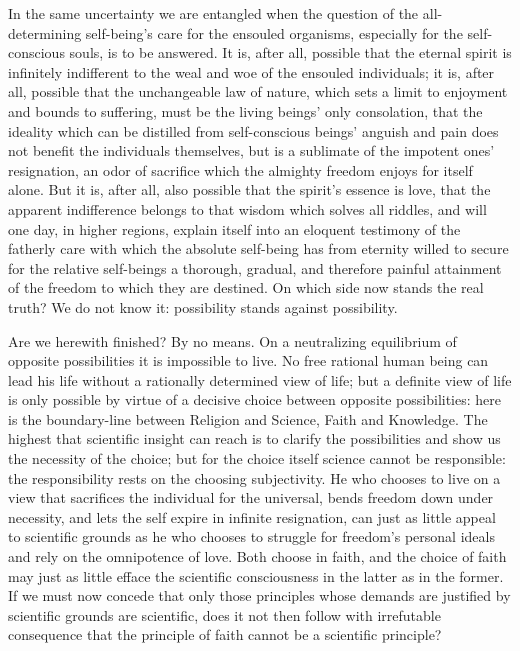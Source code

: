 \documentclass[12pt]{article}
\begin{document}
In the same uncertainty we are entangled when the question of the
all-determining self-being's care for the ensouled organisms, especially for
the self-conscious souls, is to be answered. It is, after all, possible that
the eternal spirit is infinitely indifferent to the weal and woe of the
ensouled individuals; it is, after all, possible that the unchangeable law of
nature, which sets a limit to enjoyment and bounds to suffering, must be the
living beings' only consolation, that the ideality which can be distilled from
self-conscious beings' anguish and pain does not benefit the individuals
themselves, but is a sublimate of the impotent ones' resignation, an odor of
sacrifice which the almighty freedom enjoys for itself alone. But it is, after
all, also possible that the spirit's essence is love, that the apparent
indifference belongs to that wisdom which solves all riddles, and will one
day, in higher regions, explain itself into an eloquent testimony of the
fatherly care with which the absolute self-being has from eternity willed to
secure for the relative self-beings a thorough, gradual, and therefore painful
attainment of the freedom to which they are destined. On which side now stands
the real truth? We do not know it: possibility stands against possibility.

Are we herewith finished? By no means. On a neutralizing equilibrium of
opposite possibilities it is impossible to live. No free rational human being
can lead his life without a rationally determined view of life; but a definite
view of life is only possible by virtue of a decisive choice between opposite
possibilities: here is the boundary-line between Religion and Science, Faith
and
Knowledge. The highest that scientific insight can reach is to clarify the
possibilities and show us the necessity of the choice; but for the choice
itself science cannot be responsible: the responsibility rests on the choosing
subjectivity. He who chooses to live on a view that sacrifices the individual
for the universal, bends freedom down under necessity, and lets the self
expire in infinite resignation, can just as little appeal to scientific
grounds as he who chooses to struggle for freedom's personal ideals and rely
on the omnipotence of love. Both choose in faith, and the choice of faith may
just as little efface the scientific consciousness in the latter as in the
former. If we must now concede that only those principles whose demands are
justified by scientific grounds are scientific, does it not then follow with
irrefutable consequence that the principle of faith cannot be a scientific
principle?
\end{document}
